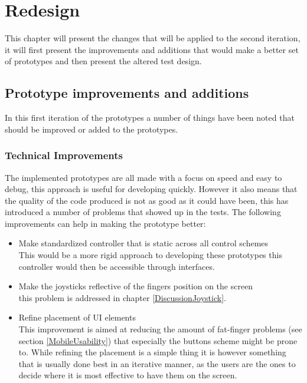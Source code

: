 \chapter {Redesign}
This chapter will present the changes that will be applied to the second iteration, it will first present the improvements and additions that would make a better set of prototypes and then present the altered test design.

\section{Prototype improvements and additions}
In this first iteration of the prototypes a number of things have been noted that should be improved or added to the prototypes. 
\subsection{Technical Improvements}
The implemented prototypes are all made with a focus on speed and easy to debug, this approach is useful for developing quickly. However it also means that the quality of the code produced is not as good as it could have been, this has introduced a number of problems that showed up in the tests. The following improvements can help in making the prototype better:

\begin{itemize}

\item Make standardized controller that is static across all control schemes\\
This would be a more rigid approach to developing these prototypes this controller would then be accessible through interfaces.

\item Make the joysticks reflective of the fingers position on the screen\\
this problem is addressed in chapter \ref{DiscussionJoystick}. 


\item Refine placement of UI elements\\ 
This improvement is aimed at reducing the amount of fat-finger problems (see section \ref{MobileUsability}) that especially the buttons scheme might be prone to. While refining the placement is a simple thing it is however something that is usually done best in an iterative manner, as the users are the ones to decide where it is most effective to have them on the screen.
\end{itemize}

